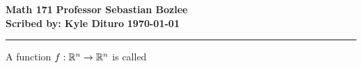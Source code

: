 \message{ !name(23.2.10.Math.171.tex)}\documentclass[12pt, twosided]{article}
\begin{document}

\noindent \textbf{Math 171} \hfill \textbf{Professor Sebastian Bozlee} \\
\textbf{Scribed by: Kyle Dituro} \hfill \textbf{\today}\hrule
\vspace{.2in}

\begin{df}
  A function \(f: \mathbb{R}^n \rightarrow \mathbb{R}^n\) is called 
\end{df}
\end{document}
